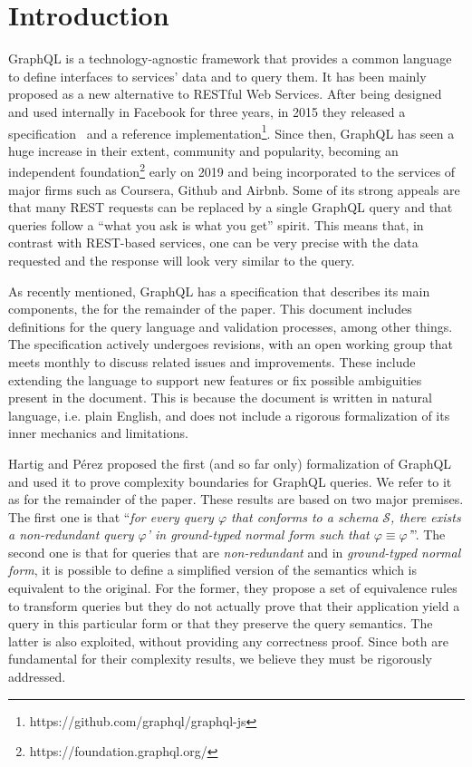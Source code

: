 
\section{Introduction}

GraphQL is a technology-agnostic framework that provides a common language to define interfaces to services' data and to query them. It has been mainly proposed as a new alternative to RESTful Web Services. After being designed and used internally in Facebook for three years, in 2015 they released a specification~\cite{gqlspec} and a reference implementation\footnote{https://github.com/graphql/graphql-js}. Since then, GraphQL has seen a huge increase in their extent, community and popularity, becoming an independent foundation\footnote{https://foundation.graphql.org/} early on 2019 and being incorporated to the services of major firms such as Coursera, Github and Airbnb. Some of its strong appeals are that many REST requests can be replaced by a single GraphQL query and that queries follow a ``what you ask is what you get'' spirit. This means that, in contrast with REST-based services, one can be very precise with the data requested and the response will look very similar to the query.

As recently mentioned, GraphQL has a specification that describes its main components, the \spec{} for the remainder of the paper. This document includes definitions for the query language and validation processes, among other things. The specification actively undergoes revisions, with an open working group that meets monthly to discuss related issues and improvements. These include extending the language to support new features or fix possible ambiguities present in the document. This is because the document is written in natural language, i.e. plain English, and does not include a rigorous formalization of its inner mechanics and limitations.

Hartig and Pérez proposed the first (and so far only) formalization of GraphQL~\cite{gqlph} and used it to prove complexity boundaries for GraphQL queries.
We refer to it as \HP{} for the remainder of the paper. These results are based on two major premises. The first one is that ``\textit{for every query $\varphi$ that conforms to a schema $\mathcal{S}$, there exists a {\normalfont non-redundant} query $\varphi$' in {\normalfont ground-typed normal form} such that $\varphi \equiv \varphi$'}''. The second one is that for queries that are \textit{non-redundant} and in \textit{ground-typed normal form}, it is possible to define a simplified version of the semantics which is equivalent to the original.
For the former, they propose a set of equivalence rules to transform queries but they do not actually prove that their application yield a query in this particular form or that they preserve the query semantics. The latter is also exploited, without providing any correctness proof. Since both are fundamental for their complexity results, we believe they must be rigorously addressed.

